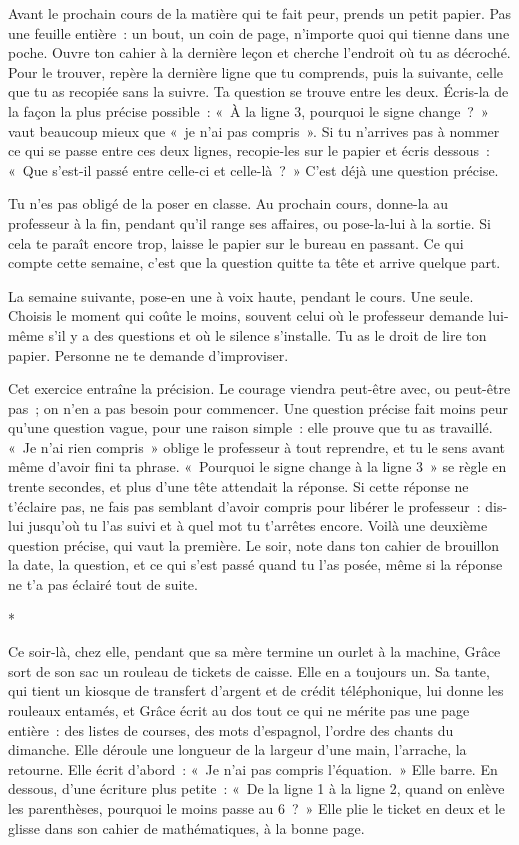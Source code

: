 \documentclass[10.5pt,twoside,openright]{book}
\newcommand{\asterisme}{\par\vspace{0.7em}\centerline{\color{gris}*\quad*\quad*}\vspace{0.7em}\par\noindent}
\newcommand{\soustitre}[1]{\par\vspace{1.1em}\noindent{\bfseries\color{accent}#1}\par\vspace{0.4em}\noindent}
\begin{document}
\soustitre{Ce soir, essaie ceci}

Avant le prochain cours de la matière qui te fait peur, prends un petit papier. Pas une feuille entière : un bout, un coin de page, n’importe quoi qui tienne dans une poche. Ouvre ton cahier à la dernière leçon et cherche l’endroit où tu as décroché. Pour le trouver, repère la dernière ligne que tu comprends, puis la suivante, celle que tu as recopiée sans la suivre. Ta question se trouve entre les deux. Écris-la de la façon la plus précise possible : « À la ligne 3, pourquoi le signe change ? » vaut beaucoup mieux que « je n’ai pas compris ». Si tu n’arrives pas à nommer ce qui se passe entre ces deux lignes, recopie-les sur le papier et écris dessous : « Que s’est-il passé entre celle-ci et celle-là ? » C’est déjà une question précise.

Tu n’es pas obligé de la poser en classe. Au prochain cours, donne-la au professeur à la fin, pendant qu’il range ses affaires, ou pose-la-lui à la sortie. Si cela te paraît encore trop, laisse le papier sur le bureau en passant. Ce qui compte cette semaine, c’est que la question quitte ta tête et arrive quelque part.

La semaine suivante, pose-en une à voix haute, pendant le cours. Une seule. Choisis le moment qui coûte le moins, souvent celui où le professeur demande lui-même s’il y a des questions et où le silence s’installe. Tu as le droit de lire ton papier. Personne ne te demande d’improviser.

Cet exercice entraîne la précision. Le courage viendra peut-être avec, ou peut-être pas ; on n’en a pas besoin pour commencer. Une question précise fait moins peur qu’une question vague, pour une raison simple : elle prouve que tu as travaillé. « Je n’ai rien compris » oblige le professeur à tout reprendre, et tu le sens avant même d’avoir fini ta phrase. « Pourquoi le signe change à la ligne 3 » se règle en trente secondes, et plus d’une tête attendait la réponse. Si cette réponse ne t’éclaire pas, ne fais pas semblant d’avoir compris pour libérer le professeur : dis-lui jusqu’où tu l’as suivi et à quel mot tu t’arrêtes encore. Voilà une deuxième question précise, qui vaut la première. Le soir, note dans ton cahier de brouillon la date, la question, et ce qui s’est passé quand tu l’as posée, même si la réponse ne t’a pas éclairé tout de suite.

\asterisme

Ce soir-là, chez elle, pendant que sa mère termine un ourlet à la machine, Grâce sort de son sac un rouleau de tickets de caisse. Elle en a toujours un. Sa tante, qui tient un kiosque de transfert d’argent et de crédit téléphonique, lui donne les rouleaux entamés, et Grâce écrit au dos tout ce qui ne mérite pas une page entière : des listes de courses, des mots d’espagnol, l’ordre des chants du dimanche. Elle déroule une longueur de la largeur d’une main, l’arrache, la retourne. Elle écrit d’abord : « Je n’ai pas compris l’équation. » Elle barre. En dessous, d’une écriture plus petite : « De la ligne 1 à la ligne 2, quand on enlève les parenthèses, pourquoi le moins passe au 6 ? » Elle plie le ticket en deux et le glisse dans son cahier de mathématiques, à la bonne page.
\end{document}
